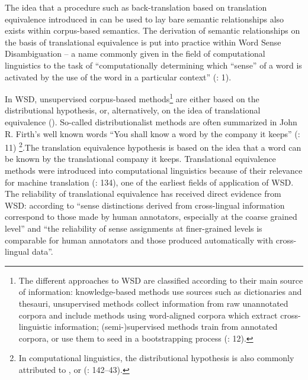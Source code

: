 The idea that a procedure such as back-translation based on translation equivalence introduced in  can be used to lay bare semantic relationships also exists within corpus-based semantics. The derivation of semantic relationships on the basis of translational equivalence is put into practice within Word Sense Disambiguation – a name commonly given in the field of computational linguistics to the task of “computationally determining which “sense” of a word is activated by the use of the word in a particular context” (\citealt{agirre_word_2007}: 1).



In WSD, unsupervised corpus-based methods\footnote{The different approaches to WSD are classified according to their main source of information: knowledge-based methods use sources such as dictionaries and thesauri, unsupervised methods collect information from raw unannotated corpora and include methods using word-aligned corpora which extract cross-linguistic information; (semi-)supervised methods train from annotated corpora, or use them to seed in a bootstrapping process (\citealt{agirre_word_2007}: 12).} are either based on the distributional hypothesis, or, alternatively, on the idea of translational equivalence (\citealt{agirre_word_2007}). So-called distributionalist methods are often summarized in John R. Firth’s well known words “You shall know a word by the company it keeps” (\citealt{firth_synopsis_1957}: 11) \footnote{In computational linguistics, the distributional hypothesis is also commonly attributed to \citet{anscombe_philosophical_1953}, \citet{harris_distributional_1954}  or \citet{Weaver1955} (\citealt{turney_frequency_2010}: 142–43).}.The translation equivalence hypothesis is based on the idea that a word can be known by the translational company it keeps. Translational equivalence methods were introduced into computational linguistics because of their relevance for machine translation (\citealt{agirre_unsupervised_2007}: 134), one of the earliest fields of application of WSD. The reliability of translational equivalence has received direct evidence from WSD: according to \citet[1]{ide_automatic_2001} “sense distinctions derived from cross-lingual information correspond to those made by human annotators, especially at the coarse grained level” and “the reliability of sense assignments at finer-grained levels is comparable for human annotators and those produced automatically with cross-lingual data”.



